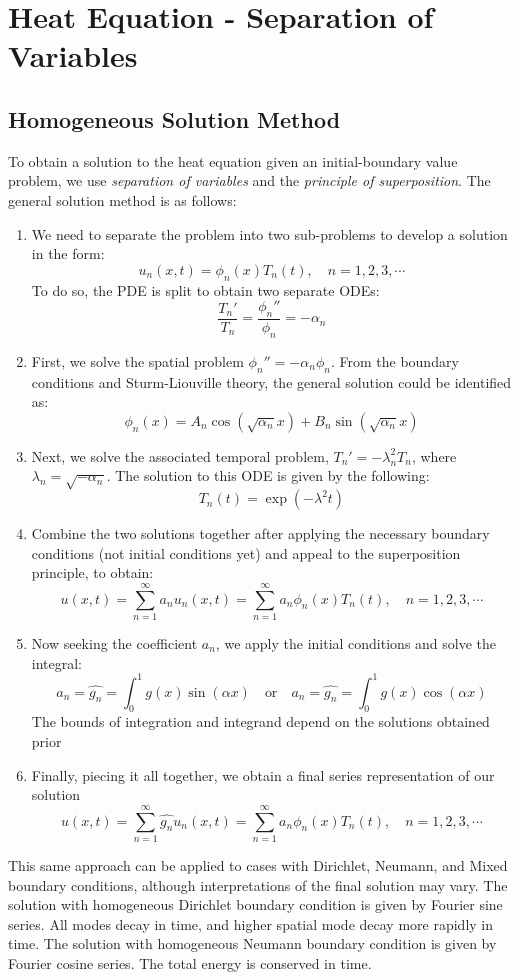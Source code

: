 \documentclass[11pt]{article}
\begin{document}
\pagebreak


\section{Heat Equation - Separation of Variables}
\subsection{Homogeneous Solution Method}
To obtain a solution to the heat equation given an initial-boundary value problem, we use \textit{separation of variables }and the \textit{principle of superposition}. The general solution method is as follows: 
\begin{enumerate}
\item We need to separate the problem into two sub-problems to develop a solution in the form: 
$$ u_n(x,t) = \phi_n(x) T_n(t), \quad n=1,2,3, \cdots$$
To do so, the PDE is split to obtain two separate ODEs:
$$ \frac{T_n'}{T_n} = \frac{\phi_n''}{\phi_n} = -\alpha_n$$
\item First, we solve the spatial problem $\phi_n'' = -\alpha_n \phi_n$.  From the boundary conditions and Sturm-Liouville theory, the general solution could be identified as:
$$ \phi_n(x) = A_n \cos ( \sqrt{\alpha_n} x) + B_n \sin ( \sqrt{\alpha_n} x)$$
\item Next, we solve the associated temporal problem, $T_n' = -\lambda_n^2 T_n$, where $\lambda_n = \sqrt{-\alpha_n}$. The solution to this ODE is given by the following: 
$$ T_n(t) = \exp(-\lambda^2 t)$$
\item Combine the two solutions together after applying the necessary boundary conditions (not initial conditions yet) and appeal to the superposition principle, to obtain:
$$u(x,t) =  \sum_{n=1}^{\infty} a_n u_n(x,t) =  \sum_{n=1}^{\infty} a_n \phi_n(x) T_n(t), \quad n=1,2,3, \cdots$$
\item Now seeking the coefficient $a_n$, we apply the initial conditions and solve the integral:
$$ a_n = \hat{g_n} = \int_0^1 g(x) \sin(\alpha x)\quad \text{or} \quad a_n = \hat{g_n} = \int_0^1 g(x) \cos(\alpha x)  $$
The bounds of integration and integrand depend on the solutions obtained prior
\item Finally, piecing it all together, we obtain a final series representation of our solution
$$u(x,t) =  \sum_{n=1}^{\infty} \hat{g_n} u_n(x,t) =  \sum_{n=1}^{\infty} a_n \phi_n(x) T_n(t), \quad n=1,2,3, \cdots$$
\end{enumerate}
This same approach can be applied to cases with Dirichlet, Neumann, and Mixed boundary conditions, although interpretations of the final solution may vary. The solution with homogeneous Dirichlet boundary condition is given by Fourier sine series.  All modes decay in time,  and higher spatial mode decay more rapidly in time. The solution with homogeneous Neumann boundary condition is given by Fourier cosine series. The total energy is conserved in time.
\pagebreak
\end{document}
